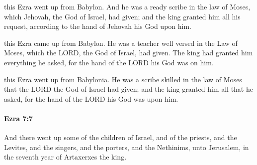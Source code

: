 			\begin{versebox}
					\item[BHS] 
					\item[LXX] 
					\item[ASV] this Ezra went up from Babylon. And he was a ready scribe in the law of Moses, which Jehovah, the God of Israel, had given; and the king granted him all his request, according to the hand of Jehovah his God upon him.
					\item[NIV] this Ezra came up from Babylon. He was a teacher well versed in the Law of Moses, which the LORD, the God of Israel, had given. The king had granted him everything he asked, for the hand of the LORD his God was on him.
					\item[NRSV] this Ezra went up from Babylonia. He was a scribe skilled in the law of Moses that the LORD the God of Israel had given; and the king granted him all that he asked, for the hand of the LORD his God was upon him.
			\end{versebox}

		\paragraph{Ezra 7:7} %
			\label{EZRA-7-7}

			And there went up some of the children of Israel, and of the priests, and the Levites, and the singers, and the porters, and the Nethinims, unto Jerusalem, in the seventh year of Artaxerxes the king.

